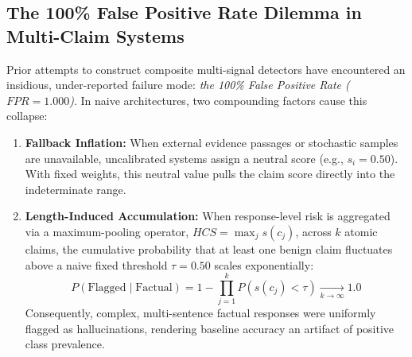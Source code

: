 \documentclass[conference]{IEEEtran}
\begin{document}
\subsection{The 100\% False Positive Rate Dilemma in Multi-Claim Systems}
Prior attempts to construct composite multi-signal detectors have encountered an insidious, under-reported failure mode: \textit{the 100\% False Positive Rate ($FPR = 1.000$)}. In naive architectures, two compounding factors cause this collapse:
\begin{enumerate}
    \item \textbf{Fallback Inflation:} When external evidence passages or stochastic samples are unavailable, uncalibrated systems assign a neutral score (e.g., $s_i = 0.50$). With fixed weights, this neutral value pulls the claim score directly into the indeterminate range.
    \item \textbf{Length-Induced Accumulation:} When response-level risk is aggregated via a maximum-pooling operator, $HCS = \max_j s(c_j)$, across $k$ atomic claims, the cumulative probability that at least one benign claim fluctuates above a naive fixed threshold $\tau = 0.50$ scales exponentially:
    \begin{equation}
        P(\text{Flagged} \mid \text{Factual}) = 1 - \prod_{j=1}^{k} P(s(c_j) < \tau) \xrightarrow[k \to \infty]{} 1.0
        \label{eq:fpr_collapse}
    \end{equation}
    Consequently, complex, multi-sentence factual responses were uniformly flagged as hallucinations, rendering baseline accuracy an artifact of positive class prevalence.
\end{enumerate}
\end{document}
